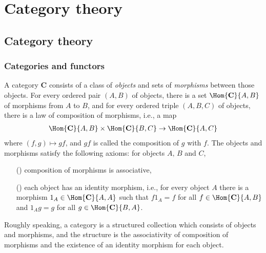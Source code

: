 \part{Category theory}

\chapter{Category theory}

\section{Categories and functors}

\begin{defi}[Category]
    A category $\textbf{C}$ consists of a class of \textit{objects} and sets of \textit{morphisms} between those objects.
    For every ordered pair $(A, B)$ of objects, there is a set $\Hom{\textbf{C}}{A, B}$ of morphisms from $A$ to $B$, and for every ordered triple $(A, B, C)$ of objects, there is a law of composition of morphisms, i.e., a map
    \begin{align*}
        \Hom{\textbf{C}}{A, B}\times\Hom{\textbf{C}}{B, C}\rightarrow\Hom{\textbf{C}}{A, C}
    \end{align*}
    where $(f, g)\mapsto gf$, and $gf$ is called the composition of $g$ with $f$.
    The objects and morphisms satisfy the following axioms: for objects $A,\, B$ and $C$,
    \begin{enumerate}
        \item[(\romannumeral 1)]
        {
            composition of morphisms is associative,
        }
        \item[(\romannumeral 2)]
        {
            each object has an identity morphism, i.e., for every object $A$ there is a morphism $1_A\in\Hom{\textbf{C}}{A, A}$ such that $f1_A=f$ for all $f\in\Hom{\textbf{C}}{A, B}$ and $1_Ag=g$ for all $g\in\Hom{\textbf{C}}{B, A}$.
        }
    \end{enumerate}
\end{defi}
Roughly speaking, a category is a structured collection which consists of objects and morphisms, and the structure is the associativity of composition of morphisms and the existence of an identity morphism for each object.

